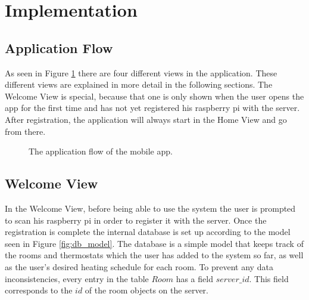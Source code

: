 \section{Implementation}

\subsection{Application Flow}

As seen in Figure \ref{fig:app_flow} there are four different views in the application. These different views are explained in more detail in the following sections. The Welcome View is special, because that one is only shown when the user opens the app for the first time and has not yet registered his raspberry pi with the server. After registration, the application will always start in the Home View and go from there.

\begin{figure}[!htb]
\caption{The application flow of the mobile app.}
	\label{fig:app_flow}
\end{figure}

\subsection{Welcome View}
\label{sec:first_view}
In the Welcome View, before being able to use the system the user is prompted to scan his raspberry pi in order to register it with the server. Once the registration is complete the internal database is set up according to the model seen in Figure \ref{fig:db_model}. The database is a simple model that keeps track of the rooms and thermostats which the user has added to the system so far, as well as the user's desired heating schedule for each room. To prevent any data inconsistencies, every entry in the table $Room$ has a field $server\_id$. This field corresponds to the $id$ of the room objects on the server.


